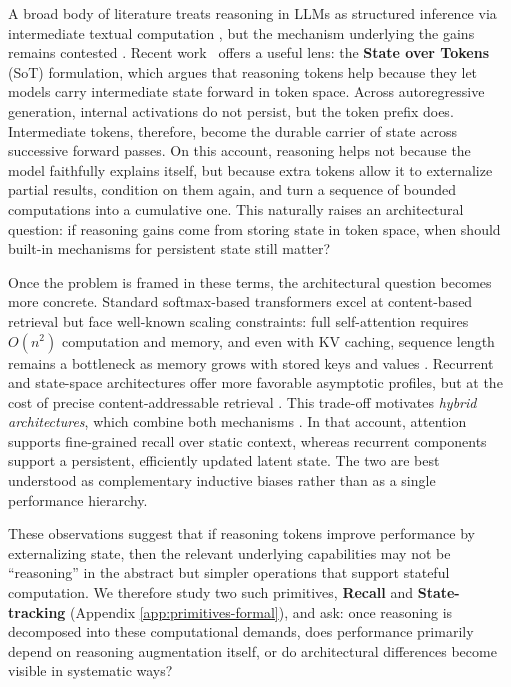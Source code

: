 \documentclass[11pt]{article}
\theoremstyle{definition}
\begin{document}
A broad body of literature treats reasoning in LLMs as structured inference via intermediate textual computation \cite{liu2025logical}, but the mechanism underlying the gains remains contested \cite{kambhampati2025reasoning}. Recent work~\cite{levy2025state} offers a useful lens: the \textbf{State over Tokens} (SoT) formulation, which argues that reasoning tokens help because they let models carry intermediate state forward in token space. Across autoregressive generation, internal activations do not persist, but the token prefix does. Intermediate tokens, therefore, become the durable carrier of state across successive forward passes. On this account, reasoning helps not because the model faithfully explains itself, but because extra tokens allow it to externalize partial results, condition on them again, and turn a sequence of bounded computations into a cumulative one. This naturally raises an architectural question: if reasoning gains come from storing state in token space, when should built-in mechanisms for persistent state still matter?

Once the problem is framed in these terms, the architectural question becomes more concrete. Standard softmax-based transformers excel at content-based retrieval but face well-known scaling constraints: full self-attention requires $O(n^2)$ computation and memory, and even with KV caching, sequence length remains a bottleneck as memory grows with stored keys and values \cite{fichtl2025end,li2024survey}. Recurrent and state-space architectures offer more favorable asymptotic profiles, but at the cost of precise content-addressable retrieval \cite{yang2024parallelizing,yang2024gated,dao2024transformers}. This trade-off motivates \textit{hybrid architectures}, which combine both mechanisms \cite{merrill2026olmo}. In that account, attention supports fine-grained recall over static context, whereas recurrent components support a persistent, efficiently updated latent state. The two are best understood as complementary inductive biases rather than as a single performance hierarchy.

These observations suggest that if reasoning tokens improve performance by externalizing state, then the relevant underlying capabilities may not be ``reasoning'' in the abstract but simpler operations that support stateful computation. We therefore study two such primitives, \textbf{Recall} and \textbf{State-tracking} (Appendix \ref{app:primitives-formal}), and ask: once reasoning is decomposed into these computational demands, does performance primarily depend on reasoning augmentation itself, or do architectural differences become visible in systematic ways?
\end{document}
